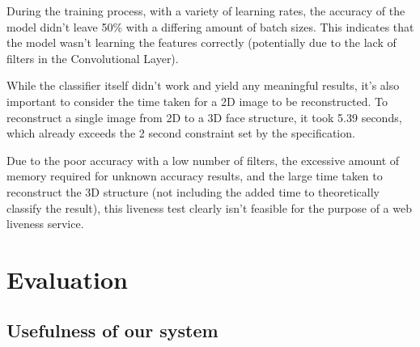 \documentclass[11pt,a4paper]{article}
\begin{document}
        During the training process, with a variety of learning rates, the accuracy of the model didn't leave 50\% with a differing amount of batch sizes. This indicates that the model wasn't learning the features correctly (potentially due to the lack of filters in the Convolutional Layer).
        
        While the classifier itself didn't work and yield any meaningful results, it's also important to consider the time taken for a 2D image to be reconstructed. 
        To reconstruct a single image from 2D to a 3D face structure, it took 5.39 seconds, which already exceeds the 2 second constraint set by the specification.

        Due to the poor accuracy with a low number of filters, the excessive amount of memory required for unknown accuracy results, and the large time taken to reconstruct the 3D structure (not including the added time to theoretically classify the result),
        this liveness test clearly isn't feasible for the purpose of a web liveness service.

\section{Evaluation}
    \subsection{Usefulness of our system}
    
\end{document}
